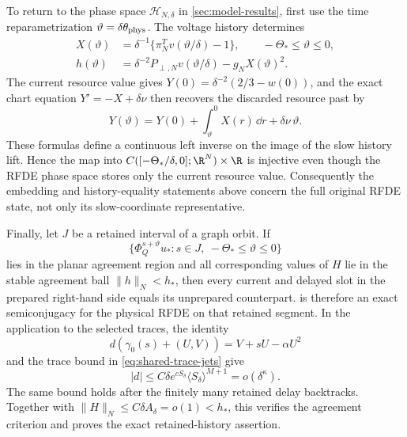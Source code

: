To return to the phase space \(\mathcal H_{N,\delta}\) in
\cref{sec:model-results}, first use the time reparametrization
\(\vartheta=\delta\theta_{\rm phys}\).  The voltage history determines
\begin{align*}
 X(\vartheta)
 &=\delta^{-1}\{\pi_N^Tv(\vartheta/\delta)-1\},\qquad
 -\Theta_*\le\vartheta\le0,\\
 h(\vartheta)
 &=\delta^{-2}P_{\perp,N}v(\vartheta/\delta)-g_NX(\vartheta)^2.
\end{align*}
The current resource value gives
\(Y(0)=\delta^{-2}(2/3-w(0))\), and the exact chart equation
\(Y'=-X+\delta\nu\) then recovers the discarded resource past by
\begin{equation}
 Y(\vartheta)=Y(0)+\int_\vartheta^0X(r)\,\dd r
                    +\delta\nu\,\vartheta .          \label{eq:invdet-recover-resource-history}
\end{equation}
These formulas define a continuous left inverse on the image of the slow
history lift.  Hence the map into
\(C([ -\Theta_*/\delta,0];\R^N)\times\R\) is injective even though the RFDE
phase space stores only the current resource value.  Consequently the
embedding and history-equality statements above concern the full original
RFDE state, not only its slow-coordinate representative.

Finally, let \(J\) be a retained interval of a graph orbit.  If
\begin{equation}
 \{\Phi_Q^{s+\vartheta}u_*:
          s\in J,\ -\Theta_*\leq\vartheta\leq0\}
\end{equation}
lies in the planar agreement region and all corresponding values of \(H\)
lie in the stable agreement ball \(\|h\|_N<h_*\), then every current and
delayed slot in the prepared right-hand side equals its unprepared
counterpart.   is therefore an exact
semiconjugacy for the physical RFDE on that retained segment.  In the
application to the selected traces, the identity
\[
 d(\gamma_0(s)+(U,V))=V+sU-\alpha U^2
\]
and the trace bound in \cref{eq:shared-trace-jets} give
\[
 |d|\leq C\delta e^{cS_\delta}\langle S_\delta\rangle^{M+1}
       =o(\delta^\kappa).
\]
The same bound holds after the finitely many retained delay backtracks.
Together with \(\|H\|_N\leq C\delta A_\delta=o(1)<h_*\), this verifies the
agreement criterion and proves the exact retained-history assertion.

